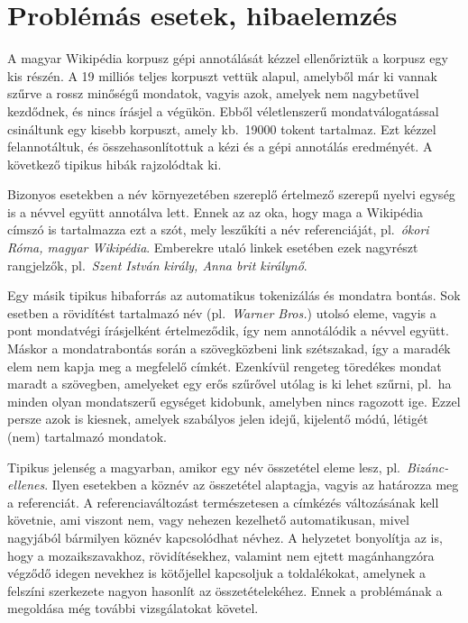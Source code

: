 \documentclass{llncs}
\begin{document}
\section{Problémás esetek, hibaelemzés}
\label{probl}

A magyar Wikipédia korpusz gépi annotálását kézzel ellenőriztük a korpusz egy kis részén. A 19 milliós teljes korpuszt vettük alapul, amelyből már ki vannak szűrve a rossz minőségű mondatok, vagyis azok, amelyek nem nagybetűvel kezdődnek, és nincs írásjel a végükön. Ebből véletlenszerű mondatválogatással csináltunk egy kisebb korpuszt, amely kb.~19000 tokent tartalmaz. Ezt kézzel felannotáltuk, és összehasonlítottuk a kézi és a gépi annotálás eredményét. A következő tipikus hibák rajzolódtak ki. 

Bizonyos esetekben a név környezetében szereplő értelmező szerepű nyelvi egység is a névvel együtt annotálva lett. Ennek az az oka, hogy maga a Wikipédia címszó is tartalmazza ezt a szót, mely leszűkíti a név referenciáját, pl.~\textit{ókori Róma, magyar Wikipédia}. Emberekre utaló linkek esetében ezek nagyrészt rangjelzők, pl.~\textit{Szent István király, Anna brit királynő}. 

Egy másik tipikus hibaforrás az automatikus tokenizálás és mondatra bontás. Sok esetben a rövidítést tartalmazó név (pl.~\textit{Warner Bros.}) utolsó eleme, vagyis a pont mondatvégi írásjelként értelmeződik, így nem annotálódik a névvel együtt. Máskor a mondatrabontás során a szövegközbeni link szétszakad, így a maradék elem nem kapja meg a megfelelő címkét. Ezenkívül rengeteg töredékes mondat maradt a szövegben, amelyeket egy erős szűrővel utólag is ki lehet szűrni, pl.~ha minden olyan mondatszerű egységet kidobunk, amelyben nincs ragozott ige. Ezzel persze azok is kiesnek, amelyek szabályos jelen idejű, kijelentő módú, létigét (nem) tartalmazó mondatok. 

Tipikus jelenség a magyarban, amikor egy név összetétel eleme lesz, pl.~\textit{Bizánc-ellenes}. Ilyen esetekben a köznév az összetétel alaptagja, vagyis az határozza meg a referenciát. A referenciaváltozást természetesen a címkézés változásának kell követnie, ami viszont nem, vagy nehezen kezelhető automatikusan, mivel nagyjából bármilyen köznév kapcsolódhat névhez. A helyzetet bonyolítja az is, hogy a mozaikszavakhoz, rövidítésekhez, valamint nem ejtett magánhangzóra végződő idegen nevekhez is kötőjellel kapcsoljuk a toldalékokat, amelynek a felszíni szerkezete nagyon hasonlít az összetételekéhez. Ennek a problémának a megoldása még további vizsgálatokat követel. 
\end{document}
